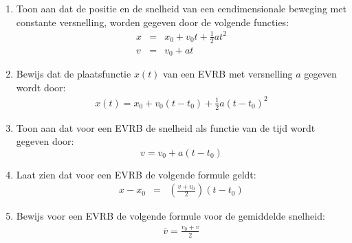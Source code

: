 




\begin{enumerate}



\item Toon aan dat de positie en de snelheid van een eendimensionale beweging met constante versnelling, worden gegeven door de volgende functies:
\begin{eqnarray*}
x&=&x_0+v_0t+\frac{1}{2}at^2\\
v&=&v_0+at 
\end{eqnarray*}

\item Bewijs dat de plaatsfunctie $x(t)$ van een EVRB met versnelling $a$ gegeven wordt door:
\begin{eqnarray*}
x(t)=x_0+v_0(t-t_0)+\frac{1}{2}a(t-t_0)^2
\end{eqnarray*}

\item Toon aan dat voor een EVRB de snelheid als functie van de tijd wordt gegeven door:
\[v=v_0+a(t-t_0)\]



\item Laat zien dat voor een EVRB de volgende formule geldt:
\begin{eqnarray*}
x-x_0&=&\left(\frac{v+v_0}{2}\right)(t-t_0)
\end{eqnarray*}

\item Bewijs voor een EVRB de volgende formule voor de gemiddelde snelheid:
\begin{eqnarray*}
\overline{v}=\frac{v_0+v}{2}
\end{eqnarray*}



\end{enumerate}
